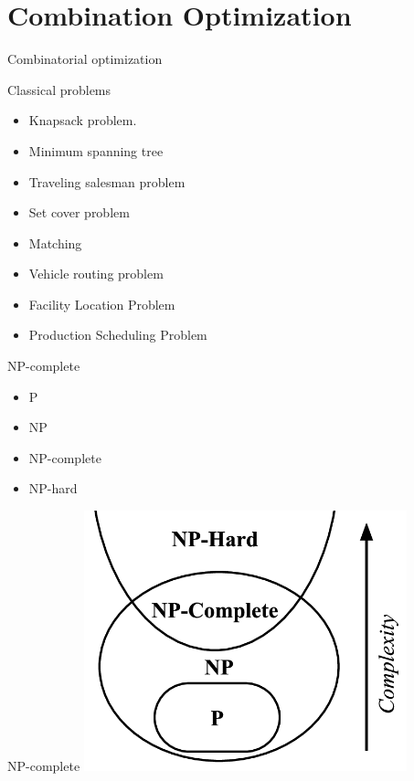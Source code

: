 \section{Combination Optimization}

    \frame{\sectionpage}

    \begin{frame}{Combinatorial optimization}

    \end{frame}

    \begin{frame}{Classical problems}
      \begin{itemize}
        \item Knapsack problem.
        \item Minimum spanning tree
        \item Traveling salesman problem
        \item Set cover problem
        \item Matching
        \item Vehicle routing problem
        \item Facility Location Problem
        \item Production Scheduling Problem
      \end{itemize}
   \end{frame}

   \begin{frame}{NP-complete}
     \begin{itemize}
       \item P
       \item NP
       \item NP-complete
       \item NP-hard
     \end{itemize}

   \end{frame}

   \begin{frame}{NP-complete}
     \centering
     \includegraphics[width = 0.7\textwidth]{images/NP.png}
   \end{frame}

